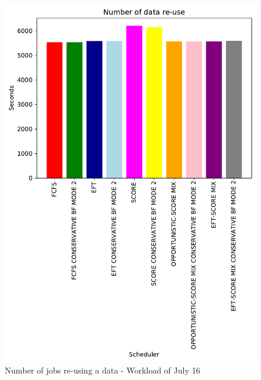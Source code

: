 \documentclass[conference,10pt]{IEEEtran}
\begin{document}
\begin{figure}\centering\includegraphics[width=1\linewidth]{../MBSS/plot/Results_FCFS_Score_Backfill_2022-07-16->2022-07-16_V10000_Number_of_data_reuse_450_128_32_256_4_1024.pdf}\caption{Number of jobs re-using a data - Workload of July 16}\end{figure}
\end{document}

